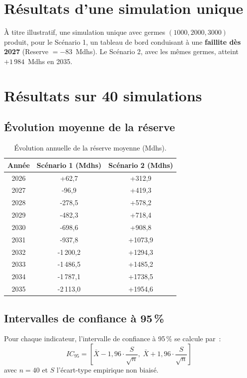 \documentclass[12pt,a4paper,oneside]{report}
\begin{document}
\section{Résultats d'une simulation unique}

À titre illustratif, une simulation unique avec germes $(1000, 2000, 3000)$
produit, pour le Scénario 1, un tableau de bord conduisant à une
\textbf{faillite dès 2027} (Reserve $= -83$~Mdhs). Le Scénario 2, avec les
mêmes germes, atteint $+1\,984$~Mdhs en 2035.

\section{Résultats sur 40 simulations}

\subsection{Évolution moyenne de la réserve}

\begin{table}[H]
\centering
\caption{Évolution annuelle de la réserve moyenne (Mdhs).}
\label{tab:reserve-moyenne}
\begin{tabular}{ccc}
\toprule
\textbf{Année} & \textbf{Scénario 1 (Mdhs)} & \textbf{Scénario 2 (Mdhs)} \\
\midrule
2026 &     +62,7  &   +312,9 \\
2027 &     -96,9  &   +419,3 \\
2028 &    -278,5  &   +578,2 \\
2029 &    -482,3  &   +718,4 \\
2030 &    -698,6  &   +908,8 \\
2031 &    -937,8  &  +1073,9 \\
2032 &  -1\,200,2 &  +1294,3 \\
2033 &  -1\,486,5 &  +1485,2 \\
2034 &  -1\,787,1 &  +1738,5 \\
2035 &  -2\,113,0 &  +1954,6 \\
\bottomrule
\end{tabular}
\end{table}

\subsection{Intervalles de confiance à 95\,\%}

Pour chaque indicateur, l'intervalle de confiance à 95\,\% se calcule par~:
\[
IC_{95} = \left[\bar{X} - 1{,}96 \cdot \frac{S}{\sqrt{n}},\;
                \bar{X} + 1{,}96 \cdot \frac{S}{\sqrt{n}}\right]
\]
avec $n = 40$ et $S$ l'écart-type empirique non biaisé.
\end{document}
